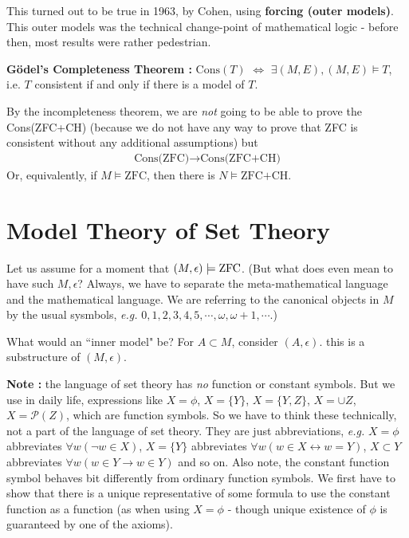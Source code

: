 \documentclass[12pt,a4paper]{article}
\begin{document}
\quad This turned out to be true in 1963, by Cohen, using \textbf{forcing (outer models)}. This outer models was the technical change-point of mathematical logic - before then, most results were rather pedestrian.
\s

\textbf{G\"{o}del's Completeness Theorem :} $\text{Cons}(T)$ $\Leftrightarrow$ $\exists (M,E), (M,E) \models T$, i.e. $T$ consistent if and only if there is a model of $T$.
\s

By the incompleteness theorem, we are \emph{not} going to be able to prove the Cons(ZFC+CH) (because we do not have any way to prove that ZFC is consistent without any additional assumptions) but
\begin{align*}
\text{Cons(ZFC)} \rightarrow \text{Cons(ZFC+CH)}
\end{align*}
Or, equivalently, if $M \models \text{ZFC}$, then there is $N\models \text{ZFC+CH}$.
\s

\section{Model Theory of Set Theory}

Let us assume for a moment that $(M, \epsilon) \models \text{ZFC}$. (But what does even mean to have such $M, \epsilon$? Always, we have to separate the meta-mathematical language and the mathematical language. We are referring to the canonical objects in $M$ by the usual sysmbols, \textit{e.g.} $0,1,2,3,4,5,\cdots, \omega, \omega+1, \cdots$.)

\quad What would an ``inner model" be? For $A\subset M$, consider $(A, \epsilon)$. this is a substructure of $(M, \epsilon)$.
\s

\textbf{Note :} the language of set theory has \emph{no} function or constant symbols. But we use in daily life, expressions like $X= \phi$, $X= \{Y\}$, $X= \{Y, Z\}$, $X= \cup Z$, $X= \mathscr{P}(Z)$, which are function symbols. So we have to think these technically, not a part of the language of set theory. They are just abbreviations, \textit{e.g.} $X= \phi$ abbreviates $\forall w(\neg w\in X)$, $X =\{ Y\}$ abbreviates $\forall w(w\in X \leftrightarrow w=Y)$, $X\subset Y$ abbreviates $\forall w(w\in Y \rightarrow w\in Y)$ and so on. Also note, the constant function symbol behaves bit differently from ordinary function symbols. We first have to show that there is a unique representative of some formula to use the constant function as a function (as when using $X= \phi$ - though unique existence of $\phi$ is guaranteed by one of the axioms).
\s
\end{document}
